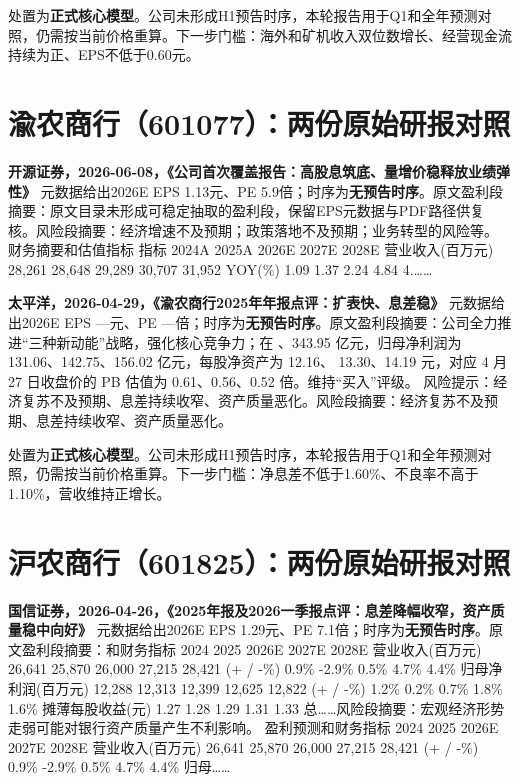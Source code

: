 \begin{keyinsight}[AStock处理]
处置为\textbf{正式核心模型}。公司未形成H1预告时序，本轮报告用于Q1和全年预测对照，仍需按当前价格重算。下一步门槛：海外和矿机收入双位数增长、经营现金流持续为正、EPS不低于0.60元。
\end{keyinsight}

\section{渝农商行（601077）：两份原始研报对照}

\textbf{开源证券，2026-06-08，《公司首次覆盖报告：高股息筑底、量增价稳释放业绩弹性》}
元数据给出2026E EPS 1.13元、PE 5.9倍；时序为\textbf{无预告时序}。原文盈利段摘要：原文目录未形成可稳定抽取的盈利段，保留EPS元数据与PDF路径供复核。风险段摘要：经济增速不及预期；政策落地不及预期；业务转型的风险等。 财务摘要和估值指标 指标 2024A 2025A 2026E 2027E 2028E 营业收入(百万元) 28,261 28,648 29,289 30,707 31,952 YOY(\%) 1.09 1.37 2.24 4.84 4.……

\textbf{太平洋，2026-04-29，《渝农商行2025年年报点评：扩表快、息差稳》}
元数据给出2026E EPS ---元、PE ---倍；时序为\textbf{无预告时序}。原文盈利段摘要：公司全力推进“三种新动能”战略，强化核心竞争力；在 、343.95 亿元，归母净利润为 131.06、142.75、156.02 亿元，每股净资产为 12.16、 13.30、14.19 元，对应 4 月 27 日收盘价的 PB 估值为 0.61、0.56、0.52 倍。维持“买入”评级。 风险提示：经济复苏不及预期、息差持续收窄、资产质量恶化。风险段摘要：经济复苏不及预期、息差持续收窄、资产质量恶化。

\begin{keyinsight}[AStock处理]
处置为\textbf{正式核心模型}。公司未形成H1预告时序，本轮报告用于Q1和全年预测对照，仍需按当前价格重算。下一步门槛：净息差不低于1.60\%、不良率不高于1.10\%，营收维持正增长。
\end{keyinsight}

\section{沪农商行（601825）：两份原始研报对照}

\textbf{国信证券，2026-04-26，《2025年报及2026一季报点评：息差降幅收窄，资产质量稳中向好》}
元数据给出2026E EPS 1.29元、PE 7.1倍；时序为\textbf{无预告时序}。原文盈利段摘要：和财务指标 2024 2025 2026E 2027E 2028E 营业收入(百万元) 26,641 25,870 26,000 27,215 28,421 (+ / -\%) 0.9\% -2.9\% 0.5\% 4.7\% 4.4\% 归母净利润(百万元) 12,288 12,313 12,399 12,625 12,822 (+ / -\%) 1.2\% 0.2\% 0.7\% 1.8\% 1.6\% 摊薄每股收益(元) 1.27 1.28 1.29 1.31 1.33 总……风险段摘要：宏观经济形势走弱可能对银行资产质量产生不利影响。 盈利预测和财务指标 2024 2025 2026E 2027E 2028E 营业收入(百万元) 26,641 25,870 26,000 27,215 28,421 (+ / -\%) 0.9\% -2.9\% 0.5\% 4.7\% 4.4\% 归母……

